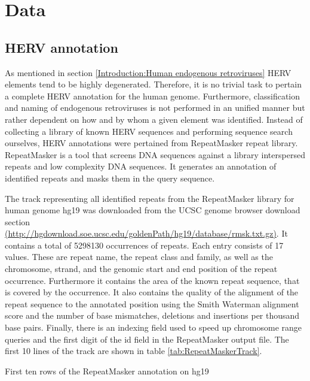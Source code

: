 \documentclass[a4paper,12pt,twoside,openright]{report}
\begin{document}
\newpage
\chapter{Data}
\label{Data}

\section{HERV annotation}
\label{Data:HERV annotation}
As mentioned in section \ref{Introduction:Human endogenous retroviruses} HERV elements tend to be highly degenerated. Therefore, it is no trivial task to pertain a complete HERV annotation for the human genome. Furthermore, classification and naming of endogenous retroviruses is not performed in an unified manner but rather dependent on how and by whom a given element was identified. 
Instead of collecting a library of known HERV sequences and performing sequence search ourselves, HERV annotations were pertained from RepeatMasker\cite{RepeatMasker} repeat library. RepeatMasker is a tool that screens DNA sequences against a library interspersed repeats and low complexity DNA sequences. It generates an annotation of identified repeats and masks them in the query sequence.

The track representing all identified repeats from the RepeatMasker library for human genome hg19 was downloaded from the UCSC genome browser download section \url{(http://hgdownload.soe.ucsc.edu/goldenPath/hg19/database/rmsk.txt.gz)}. It contains a total of 5298130 occurrences of repeats. Each entry consists of 17 values. These are repeat name, the repeat class and family, as well as the chromosome, strand, and the genomic start and end position of the repeat occurrence. Furthermore it contains the area of the known repeat sequence, that is covered by the occurrence. It also contains the quality of the alignment of the repeat sequence to the annotated position using the Smith Waterman alignment score\cite{SMITH1981195} and the number of base mismatches, deletions and insertions per thousand base pairs. Finally, there is an indexing field used to speed up chromosome range queries and the first digit of the id field in the RepeatMasker output file. The first 10 lines of the track are shown in table \ref{tab:RepeatMaskerTrack}.

\begin{table}[b]
\centering
\label{tab:RepeatMaskerTrack}
\caption{First ten rows of the RepeatMasker annotation on hg19}
\end{table}
\end{document}
